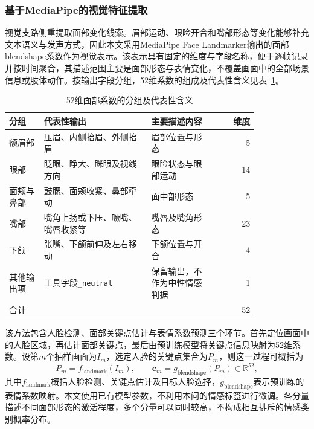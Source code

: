 \subsubsection{基于MediaPipe的视觉特征提取}

视觉支路侧重提取面部变化线索。眉部运动、眼睑开合和嘴部形态等变化能够补充文本语义与发声方式，因此本文采用MediaPipe Face Landmarker输出的面部blendshape系数作为视觉表示。该表示具有固定的维度与字段名称，便于逐帧记录并按时间聚合，其描述范围主要是面部形态与表情变化，不覆盖画面中的全部场景信息或肢体动作。按输出字段分组，52维系数的组成及代表性含义见表~\ref{tab:p1_visual_groups}。

\begin{table}[htbp]
    \centering
    \caption{52维面部系数的分组及代表性含义}
    \label{tab:p1_visual_groups}
    \begingroup
    \small
    \renewcommand{\arraystretch}{1.2}
    \begin{tabular}{@{}p{0.14\linewidth}p{0.43\linewidth}p{0.25\linewidth}r@{}}
        \hline
        分组 & 代表性输出 & 主要描述内容 & 维度\\ \hline
        额眉部 & 压眉、内侧抬眉、外侧抬眉 & 眉部位置与形态 & 5\\
        眼部 & 眨眼、睁大、眯眼及视线方向 & 眼睑状态与眼部运动 & 14\\
        面颊与鼻部 & 鼓腮、面颊收紧、鼻部牵动 & 面中部形态 & 5\\
        嘴部 & 嘴角上扬或下压、噘嘴、嘴唇收紧等 & 嘴唇及嘴角形态 & 23\\
        下颌 & 张嘴、下颌前伸及左右移动 & 下颌位置与开合 & 4\\
        其他输出项 & 工具字段\texttt{\_neutral} & 保留输出，不作为中性情感判据 & 1\\ \hline
        合计 & & & 52\\ \hline
    \end{tabular}
    \endgroup
\end{table}

该方法包含人脸检测、面部关键点估计与表情系数预测三个环节。首先定位画面中的人脸区域，再估计面部关键点，最后由预训练模型将关键点信息映射为52维系数。设第$m$个抽样画面为$I_m$，选定人脸的关键点集合为$P_m$，则这一过程可概括为
\begin{equation}
    P_m=f_{\mathrm{landmark}}(I_m),\qquad
    \boldsymbol{c}_m=g_{\mathrm{blendshape}}(P_m)
    \in\mathbb{R}^{52},
    \label{eq:p1_visual_mapping}
\end{equation}
其中$f_{\mathrm{landmark}}$概括人脸检测、关键点估计及目标人脸选择，$g_{\mathrm{blendshape}}$表示预训练的表情系数映射。本文使用已有模型参数，不利用本问的情感标签进行微调。各分量描述不同面部形态的激活程度，多个分量可以同时较高，不构成相互排斥的情感类别概率分布。

